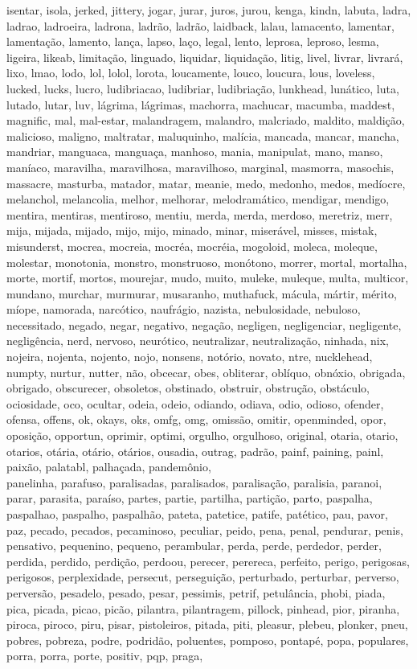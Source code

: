 isentar, isola, jerked, jittery, jogar, jurar, juros, jurou, kenga, kindn, labuta, ladra, ladrao, ladroeira, ladrona, ladrão, ladrão, laidback, lalau, lamacento, lamentar, lamentação, lamento, lança, lapso, laço, legal, lento, leprosa, leproso, lesma, ligeira, likeab, limitação, linguado, liquidar, liquidação, litig, livel, livrar, livrará, lixo, lmao, lodo, lol, lolol, lorota, loucamente, louco, loucura, lous, loveless, lucked, lucks, lucro, ludibriacao, ludibriar, ludibriação, lunkhead, lunático, luta, lutado, lutar, luv, lágrima, lágrimas, machorra, machucar, macumba, maddest, magnific, mal, mal-estar, malandragem, malandro, malcriado, maldito, maldição, malicioso, maligno, maltratar, maluquinho, malícia, mancada, mancar, mancha, mandriar, manguaca, manguaça, manhoso, mania, manipulat, mano, manso, maníaco, maravilha, maravilhosa, maravilhoso, marginal, masmorra, masochis, massacre, masturba, matador, matar, meanie, medo, medonho, medos, medíocre, melanchol, melancolia, melhor, melhorar, melodramático, mendigar, mendigo, mentira, mentiras, mentiroso, mentiu, merda, merda, merdoso, meretriz, merr, mija, mijada, mijado, mijo, mijo, minado, minar, miserável, misses, mistak, misunderst, mocrea, mocreia, mocréa, mocréia, mogoloid, moleca, moleque, molestar, monotonia, monstro, monstruoso, monótono, morrer, mortal, mortalha, morte, mortif, mortos, mourejar, mudo, muito, muleke, muleque, multa, multicor, mundano, murchar, murmurar, musaranho, muthafuck, mácula, mártir, mérito, míope, namorada, narcótico, naufrágio, nazista, nebulosidade, nebuloso, necessitado, negado, negar, negativo, negação, negligen, negligenciar, negligente, negligência, nerd, nervoso, neurótico, neutralizar, neutralização, ninhada, nix, nojeira, nojenta, nojento, nojo, nonsens, notório, novato, ntre, nucklehead, numpty, nurtur, nutter, não, obcecar, obes, obliterar, oblíquo, obnóxio, obrigada, obrigado, obscurecer, obsoletos, obstinado, obstruir, obstrução, obstáculo, ociosidade, oco, ocultar, odeia, odeio, odiando, odiava, odio, odioso, ofender, ofensa, offens, ok, okays, oks, omfg, omg, omissão, omitir, openminded, opor, oposição, opportun, oprimir, optimi, orgulho, orgulhoso, original, otaria, otario, otarios, otária, otário, otários, ousadia, outrag, padrão, painf, paining, painl, paixão, palatabl, palhaçada, pandemônio, \\ panelinha, parafuso, paralisadas, paralisados, paralisação, paralisia, paranoi, parar, parasita, paraíso, partes, partie, partilha, partição, parto, paspalha, paspalhao, paspalho, paspalhão, pateta, patetice, patife, patético, pau, pavor, paz, pecado, pecados, pecaminoso, peculiar, peido, pena, penal, pendurar, penis, pensativo, pequenino, pequeno, perambular, perda, perde, perdedor, perder, perdida, perdido, perdição, perdoou, perecer, perereca, perfeito, perigo, perigosas, perigosos, perplexidade, persecut, perseguição, perturbado, perturbar, perverso, perversão, pesadelo, pesado, pesar, pessimis, petrif, petulância, phobi, piada, pica, picada, picao, picão, pilantra, pilantragem, pillock, pinhead, pior, piranha, piroca, piroco, piru, pisar, pistoleiros, pitada, piti, pleasur, plebeu, plonker, pneu, pobres, pobreza, podre, podridão, poluentes, pomposo, pontapé, popa, populares, porra, porra, porte, positiv, pqp, praga, 